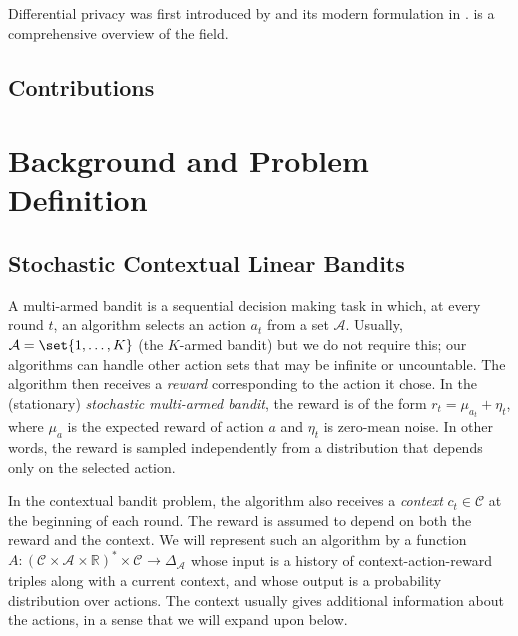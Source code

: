 \documentclass{article}
\newcommand{\Real}{\mathds{R}}
\newcommand{\A}{\mathcal{A}}
\newcommand{\C}{\mathcal{C}}
\newcommand{\Aset}[1]{\mathcal{A}_{#1}}
\newcommand{\Cset}[1]{\mathcal{C}_{#1}}
\begin{document}
Differential privacy was first introduced by
\citet{DworkCalibratingNoiseSensitivity2006} and its modern
formulation in \citet{DworkDifferentialPrivacy2006}.
 is a comprehensive
overview of the field.


\subsection{Contributions}
\label{sec:contributions}



\section{Background and Problem Definition}
\label{sec:background}


\subsection{Stochastic Contextual Linear Bandits}
\label{sec:intro-contextual}

A multi-armed bandit is a sequential decision making task in which, at
every round $t$, an algorithm selects an action $a_t$ from a set $\A$.
Usually, $\A = \set{1,\dotsc,K}$ (the $K$-armed bandit) but we do not
require this; our algorithms can handle other action sets that may be
infinite or uncountable.  The algorithm then receives a \emph{reward}
corresponding to the action it chose.  In the (stationary)
\emph{stochastic multi-armed bandit}, the reward is of the form $r_t =
\mu_{a_t} + \eta_t$, where $\mu_a$ is the expected reward of action $a$
and $\eta_t$ is zero-mean noise.  In other words, the reward is sampled
independently from a distribution that depends only on the selected
action.

In the contextual bandit problem, the algorithm also receives a
\emph{context} $c_t\in\C$ at the beginning of each round.  The reward
is assumed to depend on both the reward and the context.  We will
represent such an algorithm by a function
$A : (\Cset{}\times\Aset{}\times\Real)^* \times \Cset{} \to
\Delta_{\Aset{}}$ whose input is a history of context-action-reward
triples along with a current context, and whose output is a
probability distribution over actions.  The context usually gives
additional information about the actions, in a sense that we will
expand upon below.
\end{document}
